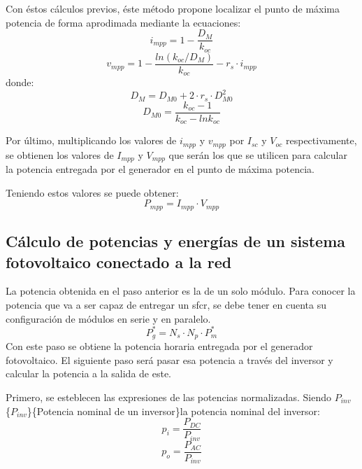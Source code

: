 Con éstos cálculos previos, éste método propone localizar el punto de máxima potencia de forma aprodimada mediante la ecuaciones:
\begin{equation}
i_{mpp}=1-\frac{D_M}{k_{oc}}
\end{equation}
\begin{equation}
v_{mpp}=1-\frac{ln(k_{oc}/D_M)}{k_{oc}}-r_s\cdot i_{mpp}
\end{equation}
donde:
\begin{equation}
D_M=D_{M0}+2\cdot r_s\cdot D_{M0}^2
\end{equation}
\begin{equation}
D_{M0}=\frac{k_{oc}-1}{k_{oc}-lnk_{oc}}
\end{equation}

Por último, multiplicando los valores de \(i_{mpp}\) y \(v_{mpp}\) por \(I_{sc}\) y \(V_{oc}\) respectivamente, se obtienen los valores de \(I_{mpp}\) y \(V_{mpp}\) que serán los que se utilicen para calcular la potencia entregada por el generador en el punto de máxima potencia.

Teniendo estos valores se puede obtener:
\begin{equation}
P_{mpp}=I_{mpp}\cdot V_{mpp}
\end{equation}

\subsection{Cálculo de potencias y energías de un sistema fotovoltaico conectado a la red}
\label{sec:org98a317f}
\label{subsec:calculo-potencias-energias}
La potencia obtenida en el paso anterior es la de un solo módulo. Para conocer la potencia que va a ser capaz de entregar un sfcr, se debe tener en cuenta su configuración de módulos en serie y en paralelo.
\begin{equation}
P_g^*=N_s\cdot N_p\cdot P_m^*
\end{equation}
Con este paso se obtiene la potencia horaria entregada por el generador fotovoltaico. El siguiente paso será pasar esa potencia a través del inversor y calcular la potencia a la salida de este.

Primero, se esteblecen las expresiones de las potencias normalizadas. Siendo \(P_{inv}\) \nomenclature[Pinv]\{\(P_{inv}\)\}\{Potencia nominal de un inversor\}la potencia nominal del inversor:
\begin{equation}
p_i=\frac{P_{DC}}{P_{inv}}
\end{equation}
\begin{equation}
p_o=\frac{P_{AC}}{P_{inv}}
\end{equation}

